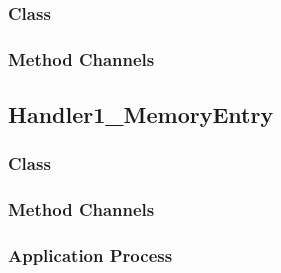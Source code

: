 \documentclass{article}
\begin{document}
\begin{circusbox}

\end{circusbox}

\subsubsection{{\OhCircus} Class}
\vspace{-0.5em}

\begin{circusbox}

\end{circusbox}

\subsubsection{Method Channels}
\vspace{-0.5em}

\begin{circusbox}

\end{circusbox}

\newpage



\subsection{Handler1\_MemoryEntry}

\subsubsection{{\OhCircus} Class}
\vspace{-0.5em}

\begin{circusbox}

\end{circusbox}

\subsubsection{Method Channels}
\vspace{-0.5em}

\begin{circusbox}

\end{circusbox}

\subsubsection{Application Process}
\vspace{-0.5em}

\begin{circusbox}

\end{circusbox}
\end{document}
